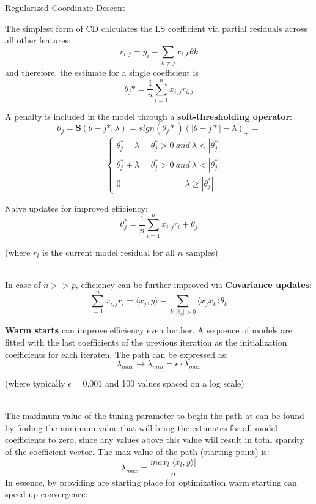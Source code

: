 \documentclass[11pt,compress,t,notes=noshow, xcolor=table]{beamer}
\begin{document}
\begin{vbframe}{Regularized Coordinate Descent}

The simplest form of CD calculates the LS coefficient via partial residuals across all other features:
$$r_{i,j} = y_{i} - \sum_{k \neq j} x_{i,k} \theta{k}$$
and therefore, the estimate for a single coefficient is
$$\theta_{j}* = \frac{1}{n} \sum_{i=1}^{n} x_{i,j}r_{i,j}$$

A penalty is included in the model through a \textbf{soft-thresholding operator}:
$$\theta_{j} = \bm{S}(\theta-{j}*, \lambda) = sign(\theta_{j}*)(|\theta-{j}*|-\lambda)_{+} = $$
$$ = \left\{ \begin{array}{rcl}
		\theta_{j}^{*} - \lambda ~~~~~~    \theta_{j}^{*}>0 ~ and ~ \lambda<|\theta_{j}^{*}| \\ 
		\theta_{j}^{*} + \lambda ~~~~~~    \theta_{j}^{*}>0 ~ and ~ \lambda<|\theta_{j}^{*}| \\ 
		0 ~~~~~~~~~~~~~~~~~~~~~~~~~~~~~~~~~~ \lambda \geq |\theta_{j}^{*}| 
   \end{array} \right. $$
   
\framebreak

Naive updates for improved efficiency:
$$\theta_{j}^{*} = \frac{1}{n} \sum_{i=1}^{n} x_{i,j}r_{i} + \theta_{j}$$
\begin{footnotesize}
(where $r_{i}$ is the current model residual for all $n$ samples)
\end{footnotesize} \\
In case of $n>>p$, efficiency can be further improved via \textbf{Covariance updates}:
$$\sum_{=1}^{n} x_{i,j}r_{i} = \langle x_{j},y \rangle - \sum_{k:|\theta_{k}|>0} \langle x_{j}x_{k} \rangle \theta_{k}$$

\framebreak

\textbf{Warm starts} can improve efficiency even further. A sequence of models are fitted with the last coefficients of the previous iteration as the initialization coefficients for each iteraten. The path can be expressed as:
$$\lambda_{max} \rightarrow \lambda_{min} = \epsilon \cdot \lambda_{max}$$
\begin{footnotesize}
(where typically $\epsilon=0.001$ and 100 values spaced on a log scale)
\end{footnotesize} \\
\vspace{0.5cm}
The maximum value of the tuning parameter to begin the path at can be found by finding the minimum value that will bring the estimates for all model coefficients to zero, since any values above this value will result in total sparsity of the coefficient vector. The max value of the path (starting point) is:
$$\lambda_{max} = \frac{max_{l}|\langle x_{l},y \rangle |}{n}$$
In essence, by providing are starting place for optimization warm starting can speed up convergence.

\end{vbframe}
\end{document}
